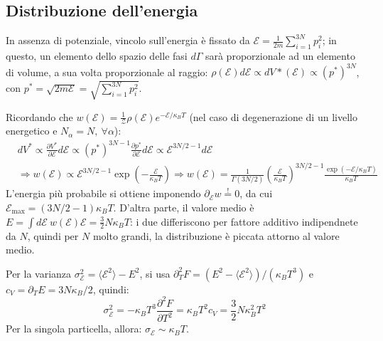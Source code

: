 \documentclass[10pt, a4paper]{scrartcl}
\numberwithin{equation}{subsection}
\theoremstyle{style1}
\begin{document}
\subsection{Distribuzione dell'energia}

In assenza di potenziale, vincolo sull'energia \`e fissato da $\mathscr{E} = \frac{1}{2m} \sum_{i=1}^{3N} p_i^2$; in questo, un elemento dello spazio delle fasi $d\Gamma$ sar\`a proporzionale ad un elemento di volume, a sua volta proporzionale al raggio: $\rho (\mathscr{E}) d \mathscr{E} \propto d V* (\mathscr{E}) \propto (p^*)^{3N } $, con $p^* = \sqrt{2 m \mathscr{E}} = \sqrt{\sum_{i=1}^{3N} p_i^2} $.

Ricordando che $w (\mathscr{E}) = \frac{1}{\mathscr{Z}}\rho (\mathscr{E}) e^{ - \mathscr{E } /\kappa _B T} $ (nel caso di degenerazione di un livello energetico e $N _\alpha  = N ,  \ \forall  \alpha $):
\[
\begin{split}
	&dV^* \propto \frac{\partial V^*}{\partial \mathscr{E}}  d \mathscr{E} \propto (p^*)^{3N -1 } \frac{\partial p^*}{\partial \mathscr{E}} d \mathscr{E}\propto \mathscr{E} ^{3N /2 -1} d \mathscr{E}\\
	&\Rightarrow  w (\mathscr{E}) \propto \mathscr{E}^{3N /2 -1 } \exp \left(- \frac{\mathscr{E}}{\kappa _B T}\right) \Rightarrow w(\mathscr{E}) = \frac{1}{\Gamma(3N / 2) } \left(\frac{\mathscr{E}}{\kappa _B T}\right) ^{3N / 2 -1} \frac{\exp(- \mathscr{E}/\kappa _B T)}{\kappa _B T}
\end{split}
\] 
L'energia pi\`u probabile si ottiene imponendo $\partial _\mathscr{E} w \stackrel{!}{=} 0$, da cui $\mathscr{E}_\text{max}= (3N / 2 -1) \kappa _B T$. D'altra parte, il valore medio \`e $E = \int d \mathscr{E} \ w(\mathscr{E}) \mathscr{E} = \frac{3}{2}N \kappa _B T $: i due differiscono per fattore additivo indipendnete da $N$, quindi per $N$ molto grandi, la distribuzione \`e piccata attorno al valore medio.

Per la varianza $\sigma _\mathscr{E}^2 = \langle \mathscr{E}^2 \rangle- E^2$, si usa $\partial _T^2 F = (E^2 - \langle \mathscr{E}^2 \rangle) / (\kappa _B T^3)$ e $c_V = \partial_T E = 3N\kappa _B / 2$, quindi:
\begin{equation}
	\sigma _\mathscr{E}^2 = - \kappa _B T^3 \frac{\partial ^2F}{\partial T^2} = \kappa _B T^2 c_V = \frac{3}{2} N\kappa _B^ 2 T^2 
\end{equation}
 Per la singola particella, allora: $\sigma _\mathscr{E} \sim \kappa _B T$.
\end{document}
